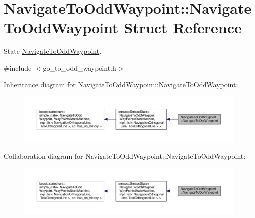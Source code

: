 \hypertarget{structNavigateToOddWaypoint_1_1NavigateToOddWaypoint}{\section{Navigate\-To\-Odd\-Waypoint\-:\-:Navigate\-To\-Odd\-Waypoint Struct Reference}
\label{structNavigateToOddWaypoint_1_1NavigateToOddWaypoint}
}


State \hyperlink{structNavigateToOddWaypoint_1_1NavigateToOddWaypoint}{Navigate\-To\-Odd\-Waypoint}.  




{\ttfamily \#include $<$go\-\_\-to\-\_\-odd\-\_\-waypoint.\-h$>$}



Inheritance diagram for Navigate\-To\-Odd\-Waypoint\-:\-:Navigate\-To\-Odd\-Waypoint\-:
\nopagebreak
\begin{figure}[H]
\begin{center}
\leavevmode
\includegraphics[width=350pt]{structNavigateToOddWaypoint_1_1NavigateToOddWaypoint__inherit__graph}
\end{center}
\end{figure}


Collaboration diagram for Navigate\-To\-Odd\-Waypoint\-:\-:Navigate\-To\-Odd\-Waypoint\-:
\nopagebreak
\begin{figure}[H]
\begin{center}
\leavevmode
\includegraphics[width=350pt]{structNavigateToOddWaypoint_1_1NavigateToOddWaypoint__coll__graph}
\end{center}
\end{figure}
